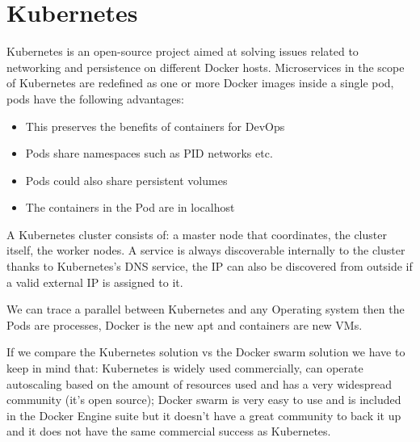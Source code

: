 \chapter{Kubernetes}
Kubernetes is an open-source project aimed at solving issues related to networking and persistence
on different Docker hosts. Microservices in the scope of Kubernetes are redefined as one or more
Docker images inside a single pod, pods have the following advantages:
\begin{itemize}
	\item This preserves the benefits of containers for DevOps
	\item Pods share namespaces such as PID networks etc.
	\item Pods could also share persistent volumes
	\item The containers in the Pod are in localhost
\end{itemize}
A Kubernetes cluster consists of: a master node that coordinates, the cluster itself, the worker
nodes. A service is always discoverable internally to the cluster thanks to Kubernetes's DNS
service, the IP can also be discovered from outside if a valid external IP is assigned to it.

We can trace a parallel between Kubernetes and any Operating system then the Pods are processes,
Docker is the new apt and containers are new VMs.

If we compare the Kubernetes solution vs the Docker swarm solution we have to keep in mind that:
Kubernetes is widely used commercially, can operate autoscaling based on the amount of resources
used and has a very widespread community (it's open source); Docker swarm is very easy to use and is
included in the Docker Engine suite but it doesn't have a great community to back it up and it does
not have the same commercial success as Kubernetes.
